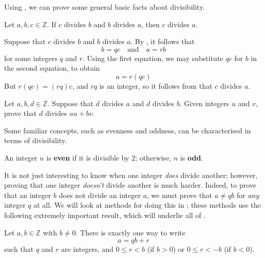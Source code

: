 Using , we can prove some general basic facts about divisibility.

\begin{proposition}
\label{propDivisibilityIsTransitive}
Let $a,b,c \in \mathbb{Z}$. If $c$ divides $b$ and $b$ divides $a$, then $c$ divides $a$.
\end{proposition}

\begin{cproof}
Suppose that $c$ divides $b$ and $b$ divides $a$. By , it follows that
\[ b=qc \quad \text{and} \quad a=rb \]
for some integers $q$ and $r$. Using the first equation, we may substitute $qc$ for $b$ in the second equation, to obtain
\[ a=r(qc) \]
But $r(qc) = (rq)c$, and $rq$ is an integer, so it follows from  that $c$ divides $a$.
\end{cproof}


\begin{exercise}
\label{exDivisibilityIsLinear}
Let $a,b,d \in \mathbb{Z}$. Suppose that $d$ divides $a$ and $d$ divides $b$. Given integers $u$ and $v$, prove that $d$ divides $au+bv$.
\end{exercise}

Some familiar concepts, such as evenness and oddness, can be characterised in terms of divisibility.

\begin{definition}
\label{defEvenOdd}
An integer $n$ is \textbf{even} if it is divisible by $2$; otherwise, $n$ is \textbf{odd}.
\end{definition}

It is not just interesting to know when one integer \textit{does} divide another; however, proving that one integer \textit{doesn't} divide another is much harder. Indeed, to prove that an integer $b$ does not divide an integer $a$, we must prove that $a \ne qb$ for \textit{any} integer $q$ at all. We will look at methods for doing this in ; these methods use the following extremely important result, which will underlie all of .

\begin{theorem}
\label{thmDivisionPreliminary}
Let $a,b \in \mathbb{Z}$ with $b \ne 0$. There is exactly one way to write
\[ a = qb + r \]
such that $q$ and $r$ are integers, and $0 \le r < b$ (if $b > 0$) or $0 \le r < -b$ (if $b < 0$).
\end{theorem}

